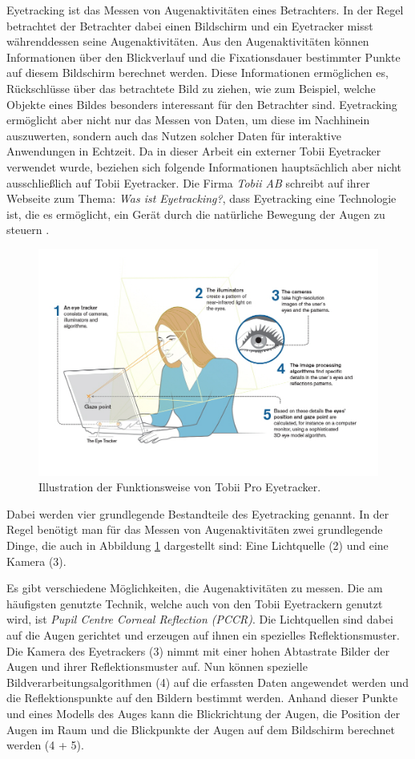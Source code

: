 Eyetracking ist das Messen von Augenaktivitäten eines Betrachters.
In der Regel betrachtet der Betrachter dabei einen Bildschirm und ein Eyetracker misst währenddessen seine Augenaktivitäten.
Aus den Augenaktivitäten können Informationen über den Blickverlauf und die Fixationsdauer bestimmter Punkte auf diesem Bildschirm berechnet werden.
Diese Informationen ermöglichen es, Rückschlüsse über das betrachtete Bild zu ziehen, wie zum Beispiel, welche Objekte eines Bildes besonders interessant für den Betrachter sind.
Eyetracking ermöglicht aber nicht nur das Messen von Daten, um diese im Nachhinein auszuwerten, sondern auch das Nutzen solcher Daten für interaktive Anwendungen in Echtzeit.
Da in dieser Arbeit ein externer Tobii Eyetracker verwendet wurde, beziehen sich folgende Informationen hauptsächlich aber nicht ausschließlich auf Tobii Eyetracker.
Die Firma \emph{Tobii AB} schreibt auf ihrer Webseite zum Thema: \emph{Was ist Eyetracking?}, dass Eyetracking eine Technologie ist, die es ermöglicht, ein Gerät durch die natürliche Bewegung der Augen zu steuern \cite{tobii}.
\begin{figure}
	\centering
	\includegraphics[width=1\textwidth]{../../Grafiken/How-20DoesEyetrackingWork_ScreenBased.jpg}
	\caption{Illustration der Funktionsweise von Tobii Pro Eyetracker. \cite{tobiipro}}
	\label{fig::et01}
\end{figure}
Dabei werden vier grundlegende Bestandteile des Eyetracking genannt.
In der Regel benötigt man für das Messen von Augenaktivitäten zwei grundlegende Dinge, die auch in Abbildung \ref{fig::et01} dargestellt sind: Eine Lichtquelle (2) und eine Kamera (3).

Es gibt verschiedene Möglichkeiten, die Augenaktivitäten zu messen.
Die am häufigsten genutzte Technik, welche auch von den Tobii Eyetrackern genutzt wird, ist \emph{Pupil Centre Corneal Reflection (PCCR)}.
Die Lichtquellen sind dabei auf die Augen gerichtet und erzeugen auf ihnen ein spezielles Reflektionsmuster.
Die Kamera des Eyetrackers (3) nimmt mit einer hohen Abtastrate Bilder der Augen und ihrer Reflektionsmuster auf.
Nun können spezielle Bildverarbeitungsalgorithmen (4) auf die erfassten Daten angewendet werden und die Reflektionspunkte auf den Bildern bestimmt werden.
Anhand dieser Punkte und eines Modells des Auges kann die Blickrichtung der Augen, die Position der Augen im Raum und die Blickpunkte der Augen auf dem Bildschirm berechnet werden (4 + 5).

